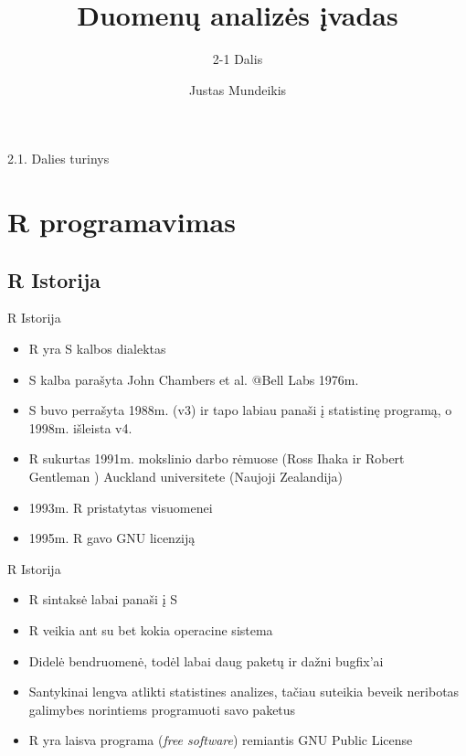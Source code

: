 \documentclass[11pt,xcolor=table]{beamer}
\author{Justas Mundeikis}
\title{Duomenų analizės įvadas}
\subtitle{2-1 Dalis}
\begin{document}

\begin{frame}
\titlepage
\end{frame}


\begin{frame}{2.1. Dalies turinys}
\tableofcontents
\end{frame}

\section{R programavimas}
\subsection{R Istorija}

\begin{frame}{R Istorija}
\begin{itemize}
\item R yra S kalbos dialektas
\item S kalba parašyta John Chambers et al. @Bell Labs 1976m.
\item S buvo perrašyta 1988m. (v3) ir tapo labiau panaši į statistinę programą, o 1998m. išleista v4.
\item R sukurtas 1991m. mokslinio darbo rėmuose (Ross Ihaka ir Robert Gentleman ) Auckland universitete (Naujoji Zealandija)
\item 1993m. R pristatytas visuomenei
\item 1995m. R gavo GNU licenziją
\end{itemize}
\end{frame}


\begin{frame}{R Istorija}
\begin{itemize}
\item R sintaksė labai panaši į S 
\item R veikia ant su bet kokia operacine sistema
\item Didelė bendruomenė, todėl labai daug paketų ir dažni bugfix'ai
\item Santykinai lengva atlikti statistines analizes, tačiau suteikia beveik neribotas galimybes norintiems programuoti savo paketus
\item R yra laisva programa (\textit{free software}) remiantis GNU Public License
\end{itemize}
\end{frame}
\end{document}
